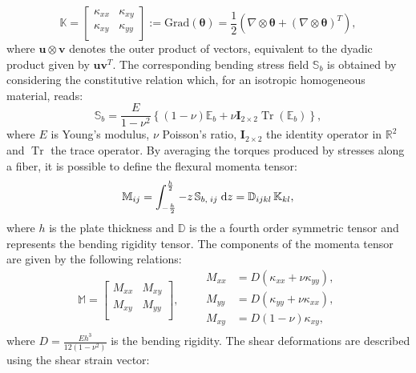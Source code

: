 \documentclass[11pt]{article}
\DeclareMathOperator{\Tr}{Tr}
\begin{document}
{		\begin{equation}
		\mathbb{K} = \begin{bmatrix}
		\kappa_{xx} &  \kappa_{xy}\\
		\kappa_{xy} & \kappa_{yy} \\
		\end{bmatrix} := \mathrm{Grad}(\bm{\theta}) =  \frac{1}{2} \left(\nabla \otimes \bm{\theta} + \left(\nabla \otimes \bm{\theta}\right)^T \right),
		\end{equation}
		where $\bm{u} \otimes {\bm{v}}$ denotes the outer product of vectors, equivalent to the dyadic product given by $\bm{u}\bm{v}^T$. The corresponding bending  stress field $\mathbb{S}_b$ is obtained by considering the constitutive relation which, for an isotropic homogeneous material, reads:
		\begin{equation}
		\mathbb{S}_{b} = \frac{E}{1-\nu^2} \left\{ (1-\nu) \mathbb{E}_b +\nu \bm{I}_{2 \times 2} \Tr(\mathbb{E}_b) \right\},
		\end{equation}
		where $E$ is Young's modulus, $\nu$ Poisson's ratio, $\bm{I}_{2 \times 2}$ the identity operator in $\mathbb{R}^2$ and $\Tr$ the trace operator. By averaging the torques produced by stresses along a fiber, it is possible to define the flexural momenta tensor:
		\begin{equation}
		\mathbb{M}_{ij} = \int_{-\frac{h}{2} }^{ \frac{h}{2} } -z \, \mathbb{S}_{b, \; ij} \d z = \mathbb{D}_{ijkl} \,  \mathbb{K}_{kl}, 
		\end{equation}
		where $h$ is the plate thickness and $\mathbb{D}$ is the a fourth order symmetric tensor and represents the bending rigidity tensor. The components of the momenta tensor are given by the following relations:
		\begin{equation}
		\mathbb{M} = \begin{bmatrix}
		M_{xx} &  M_{xy}\\
		M_{xy} &  M_{yy} \\
		\end{bmatrix},  \qquad 
		\begin{aligned}
		M_{xx} &= D\left(\kappa_{xx} + \nu \kappa_{yy} \right),\\
		M_{yy} &= D\left(\kappa_{yy} + \nu \kappa_{xx} \right),\\
		M_{xy} &= D\left(1 - \nu \right) \kappa_{xy}, \\
		\end{aligned} 
		\end{equation}
		where $D = \frac{E h^3}{12 (1 - \nu^2)}$ is the bending rigidity. The shear deformations are described using the shear strain vector:
}
\end{document}
